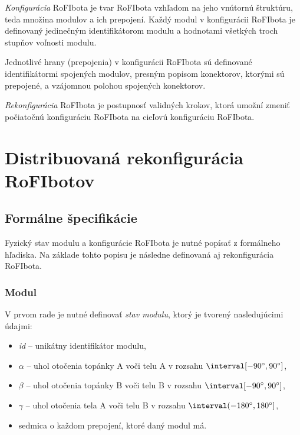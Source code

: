 \documentclass[
  printed, %
  oneside, %
  notable,   %
  nolof,     %
  nolot,     %
]{fithesis3}
\begin{document}
\textit{Konfigurácia} RoFIbota je tvar RoFIbota vzhľadom na jeho vnútornú štruktúru, teda množina modulov a ich prepojení. Každý modul v konfigurácii RoFIbota je definovaný jedinečným identifikátorom modulu a hodnotami všetkých troch stupňov voľnosti modulu. 

Jednotlivé hrany (prepojenia) v konfigurácii RoFIbota sú definované identifikátormi spojených modulov, presným popisom konektorov, ktorými sú prepojené, a vzájomnou polohou spojených konektorov. 

\textit{Rekonfigurácia} RoFIbota je postupnosť validných krokov, ktorá u\-mož\-ní zmeniť počiatočnú konfiguráciu RoFIbota na cieľovú konfiguráciu RoFIbota. 






\chapter{Distribuovaná rekonfigurácia RoFIbotov}
\section{Formálne špecifikácie}
\label{sec:formalSpec}
Fyzický stav modulu a konfigurácie RoFIbota je nutné popísať z formálneho hľadiska. Na základe tohto popisu je následne definovaná aj rekonfigurácia RoFIbota. 

\subsection{Modul}
\label{sec:formalSpecModul}
V prvom rade je nutné definovať \textit{stav modulu}, ktorý je tvorený nasledujúcimi údajmi: 
\begin{itemize}
    \item \textit{id} -- unikátny identifikátor modulu, 
    \item $\alpha$ -- uhol otočenia topánky A voči telu A v rozsahu $\interval[{-90\degree, 90\degree}]$,
    \item $\beta$ -- uhol otočenia topánky B voči telu B v rozsahu $\interval[{-90\degree, 90\degree}]$,
    \item $\gamma$ -- uhol otočenia tela A voči telu B v rozsahu $\interval({-180\degree, 180\degree}]$,
    \item sedmica o každom prepojení, ktoré daný modul má. 
\end{itemize} 
\end{document}
